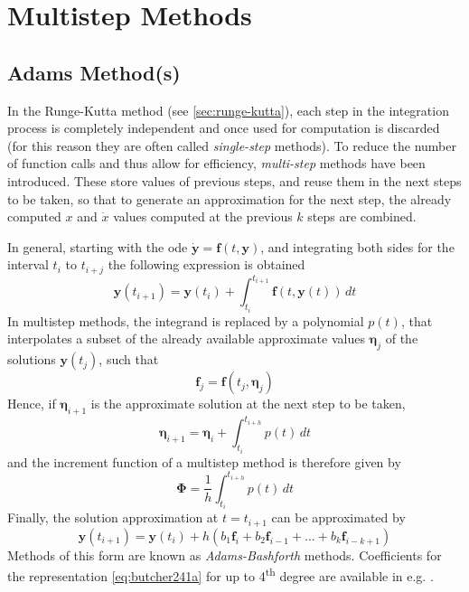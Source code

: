 \section{Multistep Methods}\label{sec:multistep-methods}


\subsection{Adams Method(s)}\label{ssec:adams-method}

In the Runge-Kutta method (see \autoref{sec:runge-kutta}), each step in the 
integration process is completely independent and once used for computation is 
discarded (for this reason they are often called \emph{single-step} methods). 
To reduce the number of function calls and thus allow for efficiency, \emph{multi-step} 
methods have been introduced. These store values of previous steps, and reuse them 
in the next steps to be taken, so that to generate an approximation for the next 
step, the already computed $x$ and $\dot{x}$ values computed at the previous $k$ 
steps are combined.

In general, starting with the \gls{ode} $\bm{\dot{y}} = \bm{f}(t,\bm{y})$, and 
integrating both sides for the interval $t_i$ to $t_{i+j}$ the following expression 
is obtained
\begin{equation}\label{eq:mont442}
    \bm{y}(t_{i+1}) = \bm{y}(t_i) + \int_{t_i}^{t_{i+1}} \bm{f}(t,\bm{y}(t)) \,dt
\end{equation}
In multistep methods, the integrand is replaced by a polynomial $p(t)$, that interpolates 
a subset of the already available approximate values $\bm{\eta}_j$ of the solutions 
$\bm{y}(t_j)$, such that
\begin{equation}\label{eq:mont443}
    \bm{f}_j = \bm{f}(t_j, \bm{\eta}_j)
\end{equation}
Hence, if $\bm{\eta}_{i+1}$ is the approximate solution at the next step to be taken, 
\begin{equation}
    \bm{\eta}_{i+1} = \bm{\eta}_i + \int_{t_i}^{t_{i+h}} p(t) \,dt
\end{equation}
and the increment function of a multistep method is therefore given by
\begin{equation}\label{eq:mont445}
    \bm{\Phi} = \frac{1}{h} \int_{t_i}^{t_{i+h}} p(t) \,dt
\end{equation}
Finally, the solution approximation at $t=t_{i+1}$ can be approximated by
\begin{equation}\label{eq:butcher241a}
    \bm{y}(t_{i+1}) = \bm{y}(t_i) + h \left( b_1 \bm{f}_i + b_2 \bm{f}_{i-1} + \dots + b_k \bm{f}_{i-k+1} \right)
\end{equation}
Methods of this form are known as \emph{Adams-Bashforth} methods. Coefficients for 
the representation \autoref{eq:butcher241a} for up to 4\textsuperscript{th} degree 
are available in e.g. \cite{Butcher2016}.

